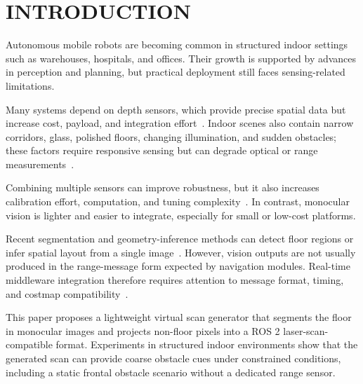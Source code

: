 \documentclass{IJCAS}
\begin{document}



\raggedbottom
\section{INTRODUCTION}\label{sec1}

Autonomous mobile robots are becoming common in structured indoor settings such as warehouses, hospitals, and offices. Their growth is supported by advances in perception and planning, but practical deployment still faces sensing-related limitations.

Many systems depend on depth sensors, which provide precise spatial data but increase cost, payload, and integration effort~\cite{gvrnextgenerationtechnologiesresearchteam_2026_autonomous,liu_2024_a}. Indoor scenes also contain narrow corridors, glass, polished floors, changing illumination, and sudden obstacles; these factors require responsive sensing but can degrade optical or range measurements~\cite{yang_2019_semantic,deepthadamodaran_2023_experimental,yang_2011_on,tibebu_2021_lidarbased,mei_2021_depthaware,sajjan_2020_clear}.

Combining multiple sensors can improve robustness, but it also increases calibration effort, computation, and tuning complexity~\cite{liu_2024_a,singh_2019_multidata}. In contrast, monocular vision is lighter and easier to integrate, especially for small or low-cost platforms.

Recent segmentation and geometry-inference methods can detect floor regions or infer spatial layout from a single image~\cite{shariqfarooqbhat_2021_adabins,ranftl_2021_vision,ultralytics_2024_ultralytics}. However, vision outputs are not usually produced in the range-message form expected by navigation modules. Real-time middleware integration therefore requires attention to message format, timing, and costmap compatibility~\cite{macenski_2022_robot,macenski_2020_the,openrobotics_sensor_msgslaserscan,opennavigationllc_2023_costmap}.

This paper proposes a lightweight virtual scan generator that segments the floor in monocular images and projects non-floor pixels into a ROS 2 laser-scan-compatible format. Experiments in structured indoor environments show that the generated scan can provide coarse obstacle cues under constrained conditions, including a static frontal obstacle scenario without a dedicated range sensor.
\end{document}
